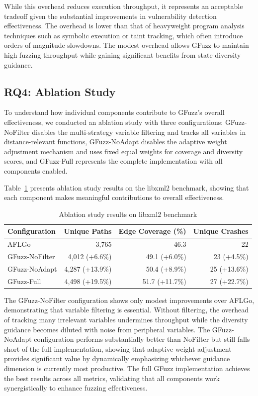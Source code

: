 \documentclass[review]{elsarticle}
\begin{document}
While this overhead reduces execution throughput, it represents an acceptable tradeoff given the substantial improvements in vulnerability detection effectiveness. The overhead is lower than that of heavyweight program analysis techniques such as symbolic execution or taint tracking, which often introduce orders of magnitude slowdowns. The modest overhead allows GFuzz to maintain high fuzzing throughput while gaining significant benefits from state diversity guidance.

\subsection{RQ4: Ablation Study}

To understand how individual components contribute to GFuzz's overall effectiveness, we conducted an ablation study with three configurations: GFuzz-NoFilter disables the multi-strategy variable filtering and tracks all variables in distance-relevant functions, GFuzz-NoAdapt disables the adaptive weight adjustment mechanism and uses fixed equal weights for coverage and diversity scores, and GFuzz-Full represents the complete implementation with all components enabled.

Table~\ref{tab:ablation} presents ablation study results on the libxml2 benchmark, showing that each component makes meaningful contributions to overall effectiveness.

\begin{table}[!htbp]
\centering
\caption{Ablation study results on libxml2 benchmark}
\label{tab:ablation}
\begin{tabular}{lrrr}
\toprule
\textbf{Configuration} & \textbf{Unique Paths} & \textbf{Edge Coverage (\%)} & \textbf{Unique Crashes} \\
\midrule
AFLGo & 3,765 & 46.3 & 22 \\
GFuzz-NoFilter & 4,012 (+6.6\%) & 49.1 (+6.0\%) & 23 (+4.5\%) \\
GFuzz-NoAdapt & 4,287 (+13.9\%) & 50.4 (+8.9\%) & 25 (+13.6\%) \\
GFuzz-Full & 4,498 (+19.5\%) & 51.7 (+11.7\%) & 27 (+22.7\%) \\
\bottomrule
\end{tabular}
\end{table}

The GFuzz-NoFilter configuration shows only modest improvements over AFLGo, demonstrating that variable filtering is essential. Without filtering, the overhead of tracking many irrelevant variables undermines throughput while the diversity guidance becomes diluted with noise from peripheral variables. The GFuzz-NoAdapt configuration performs substantially better than NoFilter but still falls short of the full implementation, showing that adaptive weight adjustment provides significant value by dynamically emphasizing whichever guidance dimension is currently most productive. The full GFuzz implementation achieves the best results across all metrics, validating that all components work synergistically to enhance fuzzing effectiveness.
\end{document}

